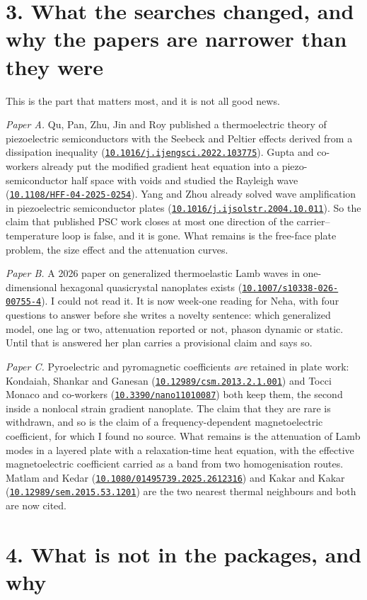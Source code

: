 \documentclass[11pt]{article}
\newcommand{\doi}[1]{\href{https://doi.org/#1}{\texttt{#1}}}
\begin{document}
\section*{3. What the searches changed, and why the papers are narrower than they were}

This is the part that matters most, and it is not all good news.

\noindent\emph{Paper A.} Qu, Pan, Zhu, Jin and Roy published a thermoelectric theory of piezoelectric
semiconductors with the Seebeck and Peltier effects derived from a dissipation inequality
(\doi{10.1016/j.ijengsci.2022.103775}). Gupta and co-workers already put the modified gradient heat equation
into a piezo-semiconductor half space with voids and studied the Rayleigh wave
(\doi{10.1108/HFF-04-2025-0254}). Yang and Zhou already solved wave amplification in piezoelectric
semiconductor plates (\doi{10.1016/j.ijsolstr.2004.10.011}). So the claim that published PSC work closes at
most one direction of the carrier--temperature loop is false, and it is gone. What remains is the free-face
plate problem, the size effect and the attenuation curves.

\noindent\emph{Paper B.} A 2026 paper on generalized thermoelastic Lamb waves in one-dimensional hexagonal
quasicrystal nanoplates exists (\doi{10.1007/s10338-026-00755-4}). I could not read it. It is now week-one
reading for Neha, with four questions to answer before she writes a novelty sentence: which generalized
model, one lag or two, attenuation reported or not, phason dynamic or static. Until that is answered her
plan carries a provisional claim and says so.

\noindent\emph{Paper C.} Pyroelectric and pyromagnetic coefficients \emph{are} retained in plate work:
Kondaiah, Shankar and Ganesan (\doi{10.12989/csm.2013.2.1.001}) and Tocci Monaco and co-workers
(\doi{10.3390/nano11010087}) both keep them, the second inside a nonlocal strain gradient nanoplate. The
claim that they are rare is withdrawn, and so is the claim of a frequency-dependent magnetoelectric
coefficient, for which I found no source. What remains is the attenuation of Lamb modes in a layered plate
with a relaxation-time heat equation, with the effective magnetoelectric coefficient carried as a band from
two homogenisation routes. Matlam and Kedar (\doi{10.1080/01495739.2025.2612316}) and Kakar and Kakar
(\doi{10.12989/sem.2015.53.1201}) are the two nearest thermal neighbours and both are now cited.

\section*{4. What is not in the packages, and why}
\end{document}
